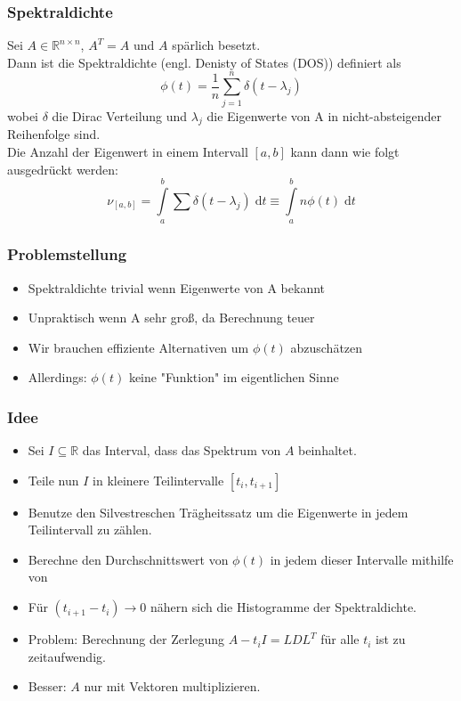 \documentclass{beamer}
\newcommand{\dt}{\;\mathrm{d}t}
\newcommand{\R}{\mathbb{R}}
\begin{document}
\begin{frame}
    \frametitle{Spektraldichte}
    Sei $A \in \R^{n \times n}$, $A^T = A$ und $A$ spärlich besetzt.\\
    Dann ist die Spektraldichte (engl. Denisty of States (DOS)) definiert als 
    \begin{equation}
        \phi(t) = \frac{1}{n} \sum_{j=1}^{n} \delta(t - \lambda_j)
    \end{equation}
    wobei $\delta$ die Dirac Verteilung und $\lambda_j$ die Eigenwerte von A in nicht-absteigender Reihenfolge sind.\\
    Die Anzahl der Eigenwert in einem Intervall $[a, b]$ kann dann wie folgt ausgedrückt werden:
    \begin{equation} \label{eq:nuab}
        \nu_{[a, b]} = \int\limits_a^b \sum \delta(t - \lambda_j) \dt \equiv \int\limits_a^b n \phi(t) \dt
    \end{equation}
\end{frame}

\begin{frame}
    \frametitle{Problemstellung}
    \begin{itemize}
        \item Spektraldichte trivial wenn Eigenwerte von A bekannt
        \item Unpraktisch wenn A sehr groß, da Berechnung teuer
        \item Wir brauchen effiziente Alternativen um $\phi(t)$ abzuschätzen
        \item Allerdings: $\phi(t)$ keine "Funktion" im eigentlichen Sinne
    \end{itemize}
\end{frame}

\begin{frame}
    \frametitle{Idee}
    \begin{itemize}
        \item Sei $I \subseteq \R$ das Interval, dass das Spektrum von $A$ beinhaltet.
        \item Teile nun $I$ in kleinere Teilintervalle $[t_i, t_{i+1}]$
        \item Benutze den Silvestreschen Trägheitssatz um die Eigenwerte in jedem Teilintervall zu zählen.
        \item Berechne den Durchschnittswert von $\phi(t)$ in jedem dieser Intervalle mithilfe von %
        \item Für $(t_{i+1} - t_i) \longrightarrow 0$ nähern sich die Histogramme der Spektraldichte.
        \item Problem: Berechnung der Zerlegung $A - t_i I = LDL^T$ für alle $t_i$ ist zu zeitaufwendig.
        \item Besser: $A$ nur mit Vektoren multiplizieren.
    \end{itemize}
\end{frame}
\end{document}
